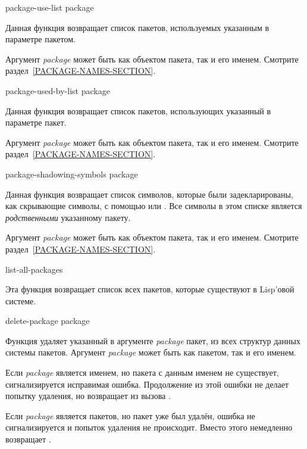 \begin{defun}[Переменная]
\begin{defun}[Функция]
package-use-list package

Данная функция возвращает список пакетов, используемых указанным в параметре
пакетом.

Аргумент \emph{package} может быть как объектом пакета, так и его
именем. Смотрите раздел~\ref{PACKAGE-NAMES-SECTION}.
\end{defun}

\begin{defun}[Функция]
package-used-by-list package

Данная функция возвращает список пакетов, использующих указанный в параметре
пакет.

Аргумент \emph{package} может быть как объектом пакета, так и его
именем. Смотрите раздел~\ref{PACKAGE-NAMES-SECTION}.
\end{defun}

\begin{defun}[Функция]
package-shadowing-symbols package

Данная функция возвращает список символов, которые были задекларированы, как
скрывающие символы, с помощью  или . Все
символы в этом списке является \emph{родственными} указанному пакету.

Аргумент \emph{package} может быть как объектом пакета, так и его
именем. Смотрите раздел~\ref{PACKAGE-NAMES-SECTION}.
\end{defun}

\begin{defun}[Функция]
list-all-packages 

Эта функция возвращает список всех пакетов, которые существуют в Lisp'овой
системе. 
\end{defun}

\begin{defun}[Функция]
delete-package package

Функция  удаляет указанный в аргументе \emph{package} пакет,
из всех структур данных системы пакетов.
Аргумент \emph{package} может быть как пакетом, так и его именем.

Если \emph{package} является именем, но пакета с данным именем не существует,
сигнализируется исправимая ошибка. Продолжение из этой ошибки не делает попытку
удаления, но возвращает  из вызова .

Если \emph{package} является пакетов, но пакет уже был удалён,
ошибка не сигнализируется и попыток удаления не происходит. Вместо этого
 немедленно возвращает .


\end{defun}
\end{defun}

